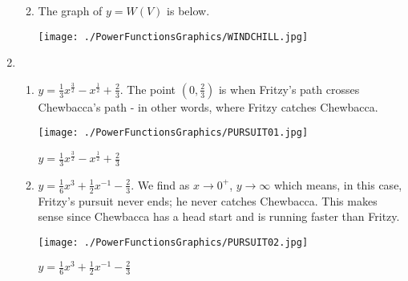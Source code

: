 \documentclass{ximera}
\begin{document}
\begin{enumerate}
\begin{enumerate}
\newpage

\item The graph of $y = W(V)$ is below.  \\

\centerline{\texttt{[image: ./PowerFunctionsGraphics/WINDCHILL.jpg]}}

\end{enumerate}



\item \begin{enumerate}

\item  $y = \frac{1}{3}x^{\frac{3}{2}} - x^{\frac{1}{2}} + \frac{2}{3}$.  The point $\left(0,\frac{2}{3}\right)$ is when Fritzy's path crosses Chewbacca's path - in other words, where Fritzy catches Chewbacca.

\begin{center} 

\texttt{[image: ./PowerFunctionsGraphics/PURSUIT01.jpg]}

 $y = \frac{1}{3}x^{\frac{3}{2}} - x^{\frac{1}{2}} + \frac{2}{3}$

\end{center}

\item $y = \frac{1}{6}x^3+\frac{1}{2}x^{-1} - \frac{2}{3}$.  We find as $x \rightarrow 0^{+}$, $y \rightarrow \infty$ which means, in this case, Fritzy's pursuit never ends;  he never catches Chewbacca. This makes sense since Chewbacca has a head start and is running faster than Fritzy.

\begin{center} 

\texttt{[image: ./PowerFunctionsGraphics/PURSUIT02.jpg]}

 $y = \frac{1}{6}x^3+\frac{1}{2}x^{-1} - \frac{2}{3}$

\end{center}


\end{enumerate}






\setcounter{HW}{\value{enumi}}
\end{enumerate}
\end{document}
